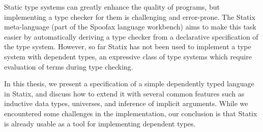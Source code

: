 \noindent Static type systems can greatly enhance the quality of programs, but implementing a type checker for them is challenging and error-prone. The Statix meta-language (part of the Spoofax language workbench) aims to make this task easier by automatically deriving a type checker from a declarative specification of the type system. However, so far Statix has not been used to implement a type system with dependent types, an expressive class of type systems which require evaluation of terms during type checking. 

In this thesis, we present a specification of a simple dependently typed language in Statix, and discuss how to extend it with several common features such as inductive data types, universes, and inference of implicit arguments. While we encountered some challenges in the implementation, our conclusion is that Statix is already usable as a tool for implementing dependent types.